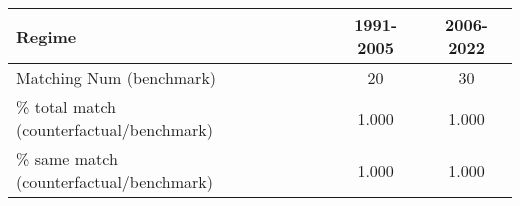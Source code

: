 
\begin{tabular}[t]{lccc}
\toprule
Regime &  & 1991-2005 & 2006-2022\\
\midrule
Matching Num (benchmark) &  & 20 & 30\\
\% total match (counterfactual/benchmark) &  & 1.000 & 1.000\\
\% same match (counterfactual/benchmark) &  & 1.000 & 1.000\\
\bottomrule
\end{tabular}
